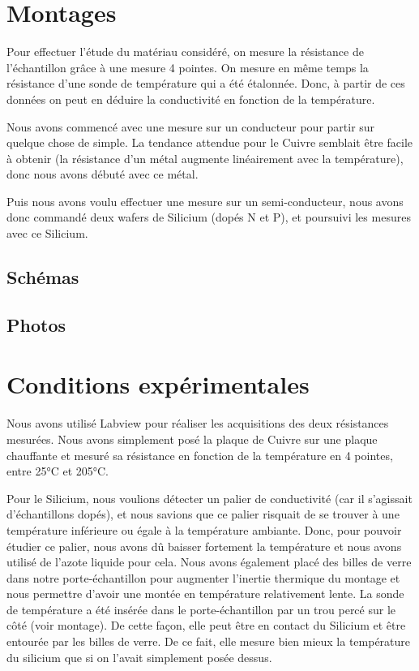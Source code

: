 \section*{Montages}
Pour effectuer l'étude du matériau considéré, on mesure la résistance de l'échantillon grâce à une mesure 4 pointes.
On mesure en même temps la résistance d'une sonde de température qui a été étalonnée.
Donc, à partir de ces données on peut en déduire la conductivité en fonction de la température.


Nous avons commencé avec une mesure sur un conducteur pour partir sur quelque chose de simple.
La tendance attendue pour le Cuivre semblait être facile à obtenir (la résistance d'un métal augmente linéairement avec la température), donc nous avons débuté avec ce métal.


Puis nous avons voulu effectuer une mesure sur un semi-conducteur, nous avons donc commandé deux wafers de Silicium (dopés N et P), et poursuivi les mesures avec ce Silicium.


\subsection*{Schémas}

\subsection*{Photos}


\section*{Conditions expérimentales}
Nous avons utilisé Labview pour réaliser les acquisitions des deux résistances mesurées.
Nous avons simplement posé la plaque de Cuivre sur une plaque chauffante et mesuré sa résistance en fonction de la température en 4 pointes, entre 25°C et 205°C.


Pour le Silicium, nous voulions détecter un palier de conductivité (car il s'agissait d'échantillons dopés), et nous savions que ce palier risquait de se trouver à une température inférieure ou égale à la température ambiante.
Donc, pour pouvoir étudier ce palier, nous avons dû baisser fortement la température et nous avons utilisé de l'azote liquide pour cela.
Nous avons également placé des billes de verre dans notre porte-échantillon pour augmenter l'inertie thermique du montage et nous permettre d'avoir une montée en température relativement lente.
La sonde de température a été insérée dans le porte-échantillon par un trou percé sur le côté (voir montage). De cette façon, elle peut être en contact du Silicium et être entourée par les billes de verre.
De ce fait, elle mesure bien mieux la température du silicium que si on l'avait simplement posée dessus.


